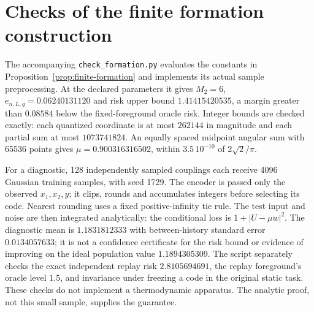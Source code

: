 \documentclass[12pt]{article}
\theoremstyle{definition}
\begin{document}
\section{Checks of the finite formation construction}
\label{app:finite-formation}

The accompanying \texttt{check\_formation.py} evaluates the constants
in Proposition~\ref{prop:finite-formation} and implements its actual
sample preprocessing. At the declared parameters it gives
$M_2=6$, $e_{n,L,q}=0.06240131120$ and risk upper bound
$1.41415420535$, a margin greater than $0.08584$ below the
fixed-foreground oracle risk.
Integer bounds are checked exactly: each quantized coordinate is at
most $262144$ in magnitude and each partial sum at most
$1073741824$. An equally spaced midpoint angular sum with 65536
points gives $\mu=0.900316316502$, within $3.5\,10^{-10}$
of $2\sqrt2/\pi$.

For a diagnostic, 128 independently sampled couplings each receive
4096 Gaussian training samples, with seed 1729.
The encoder is passed only the observed $x_1,x_2,y$; it clips,
rounds and accumulates integers before selecting its code.
Nearest rounding uses a fixed positive-infinity tie rule.
The test input and noise are then integrated analytically:
the conditional loss is $1+|U-\mu w|^2$.
The diagnostic mean is $1.1831812333$ with between-history standard
error $0.0134057633$; it is not a confidence certificate for the risk
bound or evidence of improving on the ideal population value
$1.1894305309$. The script separately checks the exact independent
replay risk $2.8105694691$, the replay foreground's oracle level
$1.5$, and invariance under freezing a code in the original static
task. These checks do not implement a thermodynamic apparatus.
The analytic proof, not this small sample, supplies the guarantee.
\end{document}
